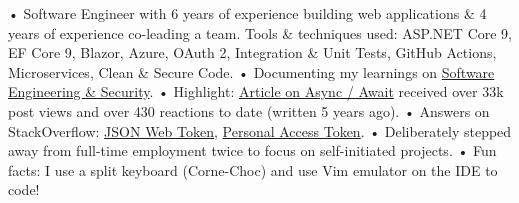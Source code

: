 

\begin{cvparagraph}

• Software Engineer with 6 years of experience building web applications \& 4 years of experience co-leading a team. Tools \& techniques used: ASP.NET Core 9, EF Core 9, Blazor, Azure, OAuth 2, Integration \& Unit Tests, GitHub Actions, Microservices, Clean \& Secure Code.
\newline
• Documenting my learnings on \href{https://bit.ly/zy-blog}{Software Engineering \& Security}.
\newline
• Highlight: \href{https://bit.ly/zy-async}{Article on Async / Await} received over 33k post views and over 430 reactions to date (written 5 years ago).
\newline
• Answers on StackOverflow: \href{https://bit.ly/zy-jwt}{JSON Web Token}, \href{https://bit.ly/zy-pat}{Personal Access Token}.
\newline
• Deliberately stepped away from full-time employment twice to focus on self-initiated projects.
\newline
• Fun facts: I use a split keyboard (Corne-Choc) and use Vim emulator on the IDE to code!
\end{cvparagraph}